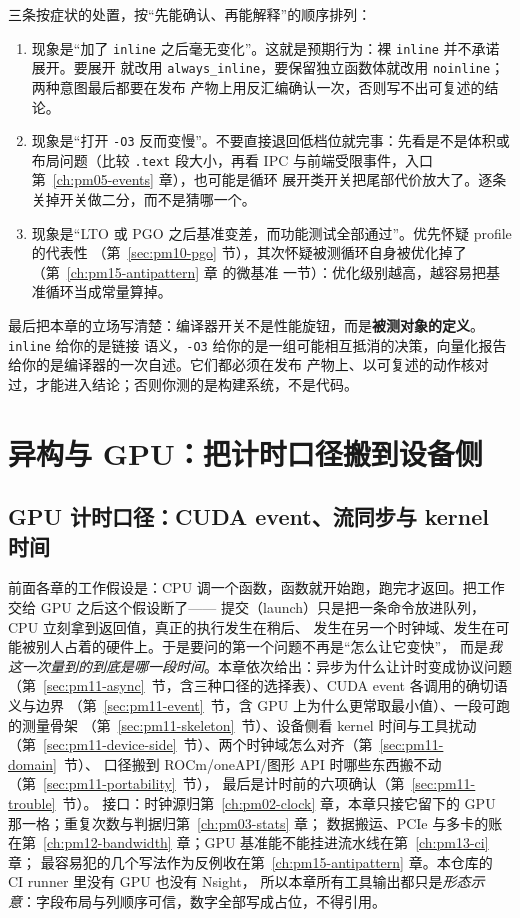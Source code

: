 \documentclass[12pt,a4paper,fontset=fandol]{ctexbook}
\newcommand{\Tp}[1]{\texttt{#1}}
\newcommand{\Bk}{\discretionary{}{}{}}
\newcommand{\Mx}[1]{\textsf{#1}}
\begin{document}
三条按症状的处置，按``先能确认、再能解释''的顺序排列：

\begin{enumerate}
  \item 现象是``加了 \Tp{inline} 之后毫无变化''。这就是预期行为：裸 \Tp{inline} 并不承诺展开。要展开
        就改用 \Tp{always\_{\Bk}inline}，要保留独立函数体就改用 \Tp{noinline}；两种意图最后都要在发布
        产物上用反汇编确认一次，否则写不出可复述的结论。
  \item 现象是``打开 \Tp{-O3} 反而变慢''。不要直接退回低档位就完事：先看是不是体积或布局问题（比较
        \Tp{.text} 段大小，再看 \Mx{IPC} 与前端受限事件，入口 第~\ref{ch:pm05-events} 章），也可能是循环
        展开类开关把尾部代价放大了。逐条关掉开关做二分，而不是猜哪一个。
  \item 现象是``LTO 或 PGO 之后基准变差，而功能测试全部通过''。优先怀疑 profile 的代表性
        （第~\ref{sec:pm10-pgo} 节），其次怀疑被测循环自身被优化掉了（第~\ref{ch:pm15-antipattern} 章 的微基准
        一节）：优化级别越高，越容易把基准循环当成常量算掉。
\end{enumerate}

最后把本章的立场写清楚：编译器开关不是性能旋钮，而是\textbf{被测对象的定义}。\Tp{inline} 给你的是链接
语义，\Tp{-O3} 给你的是一组可能相互抵消的决策，向量化报告给你的是编译器的一次自述。它们都必须在发布
产物上、以可复述的动作核对过，才能进入结论；否则你测的是构建系统，不是代码。

\part{异构与 GPU：把计时口径搬到设备侧}

\chapter{GPU 计时口径：CUDA event、流同步与 kernel 时间}
\label{ch:pm11-gpu}

前面各章的工作假设是：CPU 调一个函数，函数就开始跑，跑完才返回。把工作交给 GPU 之后这个假设断了——
提交（launch）只是把一条命令放进队列，CPU 立刻拿到返回值，真正的执行发生在稍后、
发生在另一个时钟域、发生在可能被别人占着的硬件上。于是要问的第一个问题不再是``怎么让它变快''，
而是\emph{我这一次量到的到底是哪一段时间}。本章依次给出：异步为什么让计时变成协议问题
（第~\ref{sec:pm11-async}~节，含三种口径的选择表）、CUDA event 各调用的确切语义与边界
（第~\ref{sec:pm11-event}~节，含 GPU 上为什么更常取最小值）、一段可跑的测量骨架
（第~\ref{sec:pm11-skeleton}~节）、设备侧看 kernel 时间与工具扰动
（第~\ref{sec:pm11-device-side}~节）、两个时钟域怎么对齐（第~\ref{sec:pm11-domain}~节）、
口径搬到 ROCm/oneAPI/图形 API 时哪些东西搬不动（第~\ref{sec:pm11-portability}~节），
最后是计时前的六项确认（第~\ref{sec:pm11-trouble}~节）。
接口：时钟源归第~\ref{ch:pm02-clock} 章，本章只接它留下的 GPU 那一格；重复次数与判据归第~\ref{ch:pm03-stats} 章；
数据搬运、PCIe 与多卡的账在第~\ref{ch:pm12-bandwidth} 章；GPU 基准能不能挂进流水线在第~\ref{ch:pm13-ci} 章；
最容易犯的几个写法作为反例收在第~\ref{ch:pm15-antipattern} 章。本仓库的 CI runner 里没有 GPU 也没有 Nsight，
所以本章所有工具输出都只是\emph{形态示意}：字段布局与列顺序可信，数字全部写成占位，不得引用。
\end{document}
